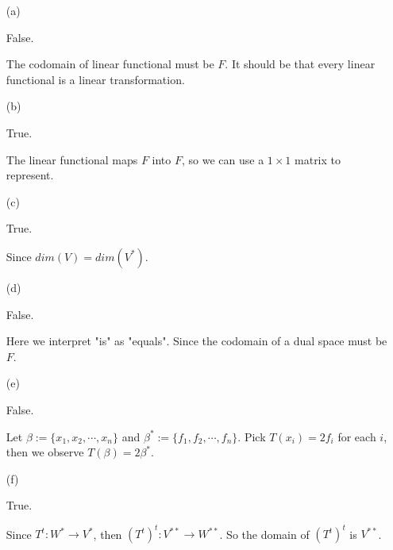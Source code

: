 \begin{Exercise}
\begin{enumerate}[(a)]
\item[(a)]
\begin{answer}
False.
\end{answer}
\begin{solution}
The codomain of linear functional must be $F$. It should be that every linear functional is a linear transformation.
\end{solution}

\item[(b)]
\begin{answer}
True.
\end{answer}
\begin{solution}
The linear functional maps $F$ into $F$, so we can use a $1\times 1$ matrix to represent.
\end{solution}

\item[(c)]
\begin{answer}
True.
\end{answer}
\begin{solution}
Since $dim(V) = dim(V^*)$.
\end{solution}

\item[(d)]
\begin{answer}
False.
\end{answer}
\begin{solution}
Here we interpret "is" as "equals". Since the codomain of a dual space must be $F$.
\end{solution}

\item[(e)]
\begin{answer}
False.
\end{answer}
\begin{solution}
Let $\beta := \{x_1,x_2,\cdots,x_n\}$ and $\beta^* := \{f_1,f_2,\cdots,f_n\}$. Pick $T(x_i) = 2f_i$ for each $i$, then we observe $T(\beta) = 2\beta^*$.
\end{solution}

\item[(f)]
\begin{answer}
True.
\end{answer}
\begin{solution}
Since $T^t:W^*\to V^*$, then $(T^t)^t:V^{**}\to W^{**}$. So the domain of $(T^t)^t$ is $V^{**}$.
\end{solution}


\end{enumerate}
\end{Exercise}

